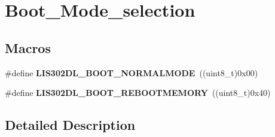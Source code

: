 \hypertarget{group___boot___mode__selection}{\section{Boot\-\_\-\-Mode\-\_\-selection}
\label{group___boot___mode__selection}
}
\subsection*{Macros}
\begin{DoxyCompactItemize}
\item 
\hypertarget{group___boot___mode__selection_gafefb6537251203abf216963782646a7d}{\#define {\bfseries L\-I\-S302\-D\-L\-\_\-\-B\-O\-O\-T\-\_\-\-N\-O\-R\-M\-A\-L\-M\-O\-D\-E}~((uint8\-\_\-t)0x00)}\label{group___boot___mode__selection_gafefb6537251203abf216963782646a7d}

\item 
\hypertarget{group___boot___mode__selection_ga7f9ceaebb422fa8fa6b5d9e78d7058e7}{\#define {\bfseries L\-I\-S302\-D\-L\-\_\-\-B\-O\-O\-T\-\_\-\-R\-E\-B\-O\-O\-T\-M\-E\-M\-O\-R\-Y}~((uint8\-\_\-t)0x40)}\label{group___boot___mode__selection_ga7f9ceaebb422fa8fa6b5d9e78d7058e7}

\end{DoxyCompactItemize}


\subsection{Detailed Description}
